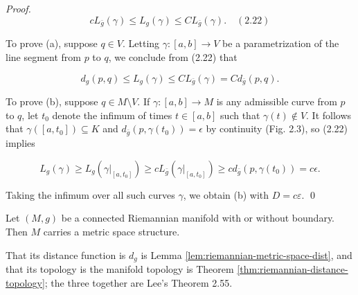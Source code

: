 \begin{lemma}
\begin{proof}
$$cL_{\bar{g}}(\gamma) \leq L_g(\gamma) \leq CL_{\bar{g}}(\gamma). \quad (2.22)$$

To prove (a), suppose $q \in V$. Letting $\gamma : [a,b] \to V$ be a parametrization of the
line segment from $p$ to $q$, we conclude from (2.22) that

$$d_g(p,q) \leq L_g(\gamma) \leq CL_{\bar{g}}(\gamma) = Cd_{\bar{g}}(p,q).$$

To prove (b), suppose $q \in M \setminus V$. If $\gamma : [a,b] \to M$ is any admissible curve from
$p$ to $q$, let $t_0$ denote the infimum of times $t \in [a,b]$ such that $\gamma(t) \notin V$. It follows
that $\gamma([a, t_0]) \subseteq K$ and $d_{\bar{g}}(p, \gamma(t_0)) = \epsilon$ by continuity (Fig. 2.3), so (2.22) implies

$$L_g(\gamma) \geq L_g(\gamma|_{[a,t_0]}) \geq cL_{\bar{g}}(\gamma|_{[a,t_0]}) \geq cd_{\bar{g}}(p, \gamma(t_0)) = c\epsilon.$$

Taking the infimum over all such curves $\gamma$, we obtain (b) with $D = c\varepsilon$. \qed
\end{proof}
\end{lemma}

\begin{theorem}
\label{thm:riemannian-manifolds-metric-spaces}
\leanok
{}

Let $(M,g)$ be a connected Riemannian manifold with or without boundary. Then $M$ carries a
metric space structure.

That its distance function is $d_g$ is Lemma \ref{lem:riemannian-metric-space-dist}, and that
its topology is the manifold topology is Theorem \ref{thm:riemannian-distance-topology}; the
three together are Lee's Theorem 2.55.
\end{theorem}

